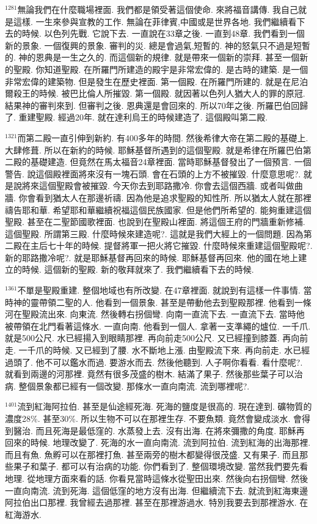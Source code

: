 \documentclass{book}
\begin{document}
$^{1281}$無論我們在什麼職場裡面.
我們都是領受著這個使命.
來將福音講傳.
我自己就是這樣.
一生來參與宣教的工作.
無論在菲律賓,中國或是世界各地.
我們繼續看下去的時候.
以色列先戰.
它說下去.
一直說在33章之後.
一直到48章.
我們看到一個新的景象.
一個復興的景象.
審判的災.
總是會過氣,短暫的.
神的怒氣只不過是短暫的.
神的恩典是一生之久的.
而這個新的規律.
就是帶來一個新的崇拜.
甚至一個新的聖殿.
你知道聖殿.
在所羅門所建造的殿宇是非常宏偉的.
是古時的建築.
是一個非常宏偉的建築物.
但是發生在歷史裡面.
第一個殿.
在所羅門所建的.
就是在尼泊爾殺王的時候.
被巴比倫人所摧毀.
第一個殿.
就因著以色列人猶大人的罪的原冠.
結果神的審判來到.
但審判之後.
恩典還是會回來的.
所以70年之後.
所羅巴伯回歸了.
重建聖殿.
經過20年.
就在達利烏王的時候建造了.
這個殿叫第二殿.

$^{1321}$而第二殿一直引伸到新約.
有400多年的時間.
然後希律大帝在第二殿的基礎上.
大肆修葺.
所以在新約的時候.
耶穌基督所遇到的這個聖殿.
就是希律在所羅巴伯第二殿的基礎建造.
但竟然在馬太福音24章裡面.
當時耶穌基督發出了一個預言.
一個警告.
說這個殿裡面將來沒有一塊石頭.
會在石頭的上方不被摧毀.
什麼意思呢?.
就是說將來這個聖殿會被摧毀.
今天你去到耶路撒冷.
你會去這個西牆.
或者叫做曲牆.
你會看到猶太人在那邊祈禱.
因為他是追求聖殿的知性所.
所以猶太人就在那裡禱告耶和華.
希望耶和華繼續祝福這個民族國家.
但是他們所希望的.
能夠重建這個聖殿.
甚至在二聖節國歌裡面.
也說到在聖殿山裡面.
將這個王府的門牆重新修補.
這個聖殿.
所謂第三殿.
什麼時候來建造呢?.
這就是我們大經上的一個問題.
因為第二殿在主后七十年的時候.
提督將軍一把火將它摧毀.
什麼時候來重建這個聖殿呢?.
新的耶路撒冷呢?.
就是耶穌基督再回來的時候.
耶穌基督再回來.
他的國在地上建立的時候.
這個新的聖殿.
新的敬拜就來了.
我們繼續看下去的時候.

$^{1361}$不單是聖殿重建.
整個地域也有所改變.
在47章裡面.
就說到有這樣一件事情.
當時神的靈帶領二聖的人.
他看到一個景象.
甚至是帶動他去到聖殿那裡.
他看到一條河在聖殿流出來.
向東流.
然後轉右拐個彎.
向南一直流下去.
一直流下去.
當時他被帶領在北門看著這條水.
一直向南.
他看到一個人.
拿著一支準繩的爐位.
一千爪.
就是500公尺.
水已經揚入到眼睛那裡.
再向前走500公尺.
又已經撞到膝蓋.
再向前走.
一千爪的時候.
又已經到了腰.
水不斷地上漲.
由聖殿流下來.
再向前走.
水已經過頭了.
他不可以鑑水而過.
要游水而去.
然後他聽到.
人子啊你看看.
看什麼呢?.
就看到兩邊的河那裡.
竟然有很多茂盛的樹木.
結滿了果子.
然後那些葉子可以治病.
整個景象都已經有一個改變.
那條水一直向南流.
流到哪裡呢?.

$^{1401}$流到紅海阿拉伯.
甚至是仙途經死海.
死海的鹽度是很高的.
現在達到.
礦物質的濃度28\%.
甚至30\%.
所以生物不可以在那裡生存.
不要魚類.
竟然會變成淡水.
會得到醫治.
而且死海是最低窪的.
水蒸發上去.
沒有出海.
在將來彌撒的角度.
耶穌再回來的時候.
地理改變了.
死海的水一直向南流.
流到阿拉伯.
流到紅海的出海那裡.
而且有魚.
魚孵可以在那裡打魚.
甚至兩旁的樹木都變得很茂盛.
又有果子.
而且那些果子和葉子.
都可以有治病的功能.
你們看到了.
整個環境改變.
當然我們要先看地理.
從地理方面來看的話.
你看見當時這條水從聖田出來.
然後向右拐個彎.
然後一直向南流.
流到死海.
這個低窪的地方沒有出海.
但繼續流下去.
就流到紅海東邊阿拉伯出口那裡.
我曾經去過那裡.
甚至在那裡游過水.
特別我要去到那裡游水.
在紅海游水.
\end{document}

